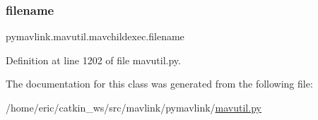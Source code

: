 \subsubsection{\texorpdfstring{filename}{filename}}
{\footnotesize\ttfamily pymavlink.\+mavutil.\+mavchildexec.\+filename}



Definition at line 1202 of file mavutil.\+py.



The documentation for this class was generated from the following file\+:\begin{DoxyCompactItemize}
\item 
/home/eric/catkin\+\_\+ws/src/mavlink/pymavlink/\mbox{\hyperlink{mavutil_8py}{mavutil.\+py}}\end{DoxyCompactItemize}
